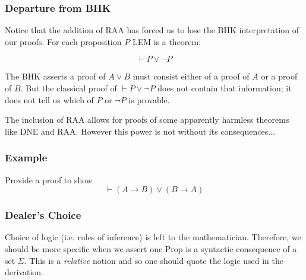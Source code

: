 \documentclass{beamer}
\begin{document}
\begin{frame}
  \frametitle{Departure from BHK}

    Notice that the addition of RAA has forced us to lose the BHK interpretation of our proofs. For each proposition $P$ LEM is a theorem: 

    $$ \vdash P \lor \lnot P$$

    The BHK asserts a proof of $A \lor B$ must consist either of a proof of $A$ or a proof of $B$. But the classical proof of $\vdash P \lor \lnot P$ does not contain that information; it does not tell us which of $P$ or $\lnot P$ is provable. 

	\vspace{0.5cm}

	The inclusion of RAA allows for proofs of some apparently harmless theorems like DNE and RAA. However this power is not without its consequences...

\end{frame}

\begin{frame}
	\frametitle{Example}
	Provide a proof to show $$ \vdash (A \to B) \lor (B \to A)$$
	\vspace{6cm}
	
	
\end{frame}

\begin{frame}
	\frametitle{Dealer's Choice}

	Choice of logic (i.e. rules of inference) is left to the mathematician. Therefore, we should be more specific when we assert one Prop is a syntactic consequence of a set $\Sigma$. This is a \emph{relative} notion and so one should quote the logic used in the derivation. 

	\vspace{4cm}


\end{frame}
\end{document}
